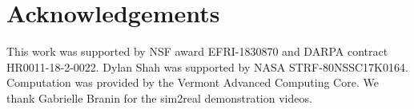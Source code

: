 
\section*{Acknowledgements}


This work was supported by NSF award EFRI-1830870 and
DARPA contract HR0011-18-2-0022.
Dylan Shah was supported by NASA 
STRF-80NSSC17K0164.
Computation was provided by the
Vermont Advanced Computing Core.
We thank Gabrielle Branin 
for the sim2real 
demonstration 
videos.
